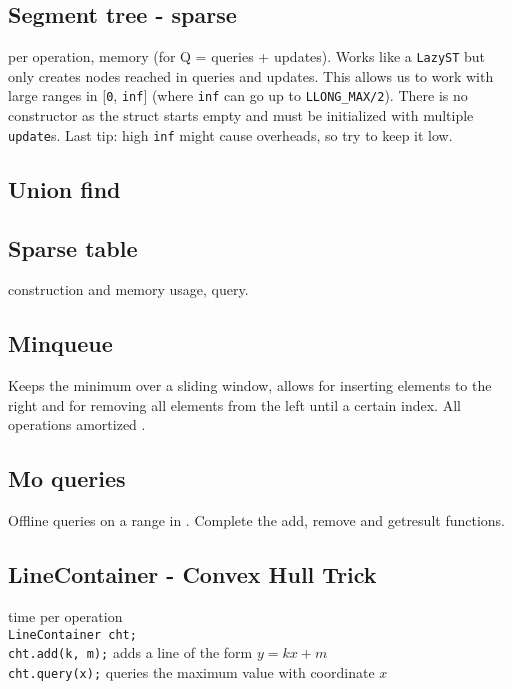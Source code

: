 \subsection{Segment tree - sparse}
 per operation,  memory (for Q = queries + updates).
Works like a \verb|LazyST| but only creates nodes reached in queries and updates.
This allows us to work with large ranges in [\verb|0|, \verb|inf|] (where \verb|inf| can go up to \verb|LLONG_MAX/2|).
There is no constructor as the struct starts empty and must be initialized with multiple \verb|update|s.
Last tip: high \verb|inf| might cause overheads, so try to keep it low.

\subsection{Union find}

\subsection{Sparse table}
 construction and memory usage,  query.

\subsection{Minqueue}
Keeps the minimum over a sliding window, allows for inserting elements to the right and for removing all elements from the left until a certain index. All operations amortized .

\subsection{Mo queries}
Offline queries on a range in . Complete the add, remove and getresult functions.

\subsection{LineContainer - Convex Hull Trick}

 time per operation \\
\verb|LineContainer cht;| \\
\verb|cht.add(k, m);| adds a line of the form $y = kx + m$ \\
\verb|cht.query(x);| queries the maximum value with coordinate $x$ \\

